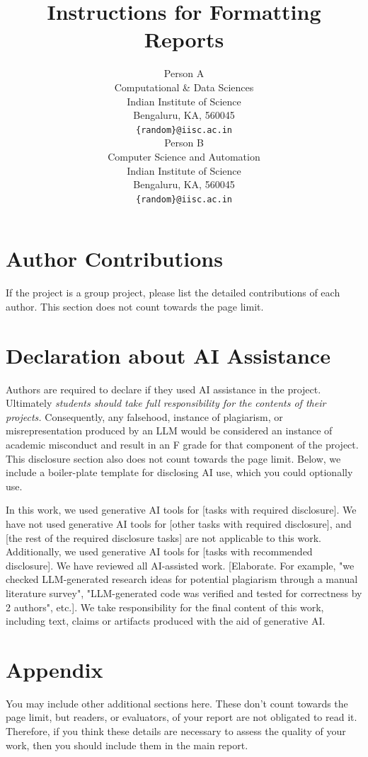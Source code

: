 \documentclass{article} %
\title{Instructions for Formatting Reports}
\author{Person A   \\
Computational \& Data Sciences\\
Indian Institute of Science \\
Bengaluru, KA, 560045 \\
\texttt{\{random\}@iisc.ac.in} \\
\And
Person B \\
Computer Science and Automation \\
Indian Institute of Science \\
Bengaluru, KA, 560045 \\
\texttt{\{random\}@iisc.ac.in} \\
}
\begin{document}
\ifcolmsubmission
\linenumbers
\fi

\maketitle









\section*{Author Contributions}
If the project is a group project, please list the detailed contributions of each author.
This section does not count towards the page limit.

\section*{Declaration about AI Assistance}
Authors are required to declare if they used AI assistance in the project. 
Ultimately \emph{students should take full responsibility 
for the contents of their projects.} 
Consequently, 
any falsehood, 
instance of plagiarism, 
or misrepresentation produced by an LLM 
would be considered an instance of academic misconduct 
and result in an F grade for that component of the project.
This disclosure section also does not count towards the page limit. 
Below, we include a boiler-plate template for disclosing AI use, 
which you could optionally use.


In this work, we used generative AI tools for [tasks with required disclosure].
We have not used generative AI tools for [other tasks with required disclosure],
and [the rest of the required disclosure tasks] are not applicable to this work.
Additionally, we used generative AI tools for [tasks with recommended
disclosure]. We have reviewed all AI-assisted work. [Elaborate. For example, "we
checked LLM-generated research ideas for potential plagiarism through a manual
literature survey", "LLM-generated code was verified and tested for correctness
by 2 authors", etc.]. We take responsibility for the final content of this work,
including text, claims or artifacts produced with the aid of generative AI.







\appendix
\newpage
\section{Appendix}
You may include other additional sections here. These don't count towards the page limit, 
but readers, or evaluators, of your report are not obligated to read it. Therefore, 
if you think these details are necessary to assess the quality of your work, 
then you should include them in the main report.
\end{document}
